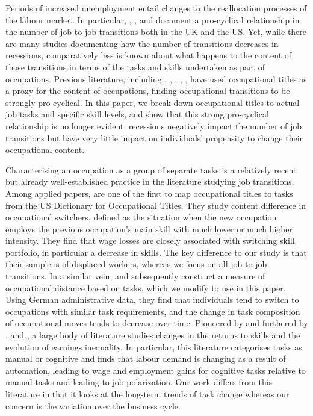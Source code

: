 \documentclass[preprint,12pt,authoryear]{elsarticle}
\begin{document}
Periods of increased unemployment entail changes to the reallocation processes of the labour market. In particular,  \cite{Carrillo-Tudela2016},  \cite{MurphyTopel1987}, \cite{Moscarini2007} and \cite{Kambourov2008} document a pro-cyclical relationship in the number of job-to-job transitions both in the UK and the US. Yet, while there are many studies documenting how the number of transitions decreases in recessions, comparatively less is known about what happens to the content of those transitions in terms of the tasks and skills undertaken as part of occupations. Previous literature, including \cite{MurphyTopel1987}, \cite{Moscarini2007}, \cite{Kambourov2008}, \cite{Carrillo-Tudela2014}, \cite{Carrillo-Tudela2016}, have used occupational titles as a proxy for the content of occupations, finding occupational transitions to be strongly pro-cyclical. 	
In this paper, we break down occupational titles to actual job tasks and specific skill levels, and show that this strong pro-cyclical relationship is no longer evident: recessions negatively impact the number of job transitions but have very little impact on individuals' propensity to change their occupational content. 

\vspace{2mm}

Characterising an occupation as a group of separate tasks is a relatively recent but already well-established practice in the literature studying job transitions. Among applied papers, \cite{Poletaev2008} are one of the first to map occupational titles to tasks from the US Dictionary for Occupational Titles. %
They study content difference in occupational switchers, defined as the situation when the new occupation employs the previous occupation's main skill with much lower or much higher intensity. They find that wage losses are closely associated with switching skill portfolio, in particular a decrease in skills. The key difference to our study is that their sample is of displaced workers, whereas we focus on all job-to-job transitions. %
In a similar vein, \cite{Gathmann2010} and subsequently \cite{robinson2018} construct a measure of occupational distance based on tasks, which we modify to use in this paper. Using German administrative data, they find that individuals tend to switch to occupations with similar task requirements, and the change in task composition of occupational moves tends to decrease over time.  Pioneered by \cite{ALM2003} and furthered by \cite{AcemogluAutor2011}, \cite{AutorDorn2013}  and \cite{GoosManningSalomons2014}, a large body of literature studies changes in the returns to skills and the evolution of earnings inequality. In particular, this literature categorises tasks as manual or cognitive and finds that labour demand is changing as a result of automation, leading to wage and employment gains for cognitive tasks relative to manual tasks and leading to job polarization. Our work differs from this literature in that it looks at the long-term trends of task change whereas our concern is the variation over the business cycle.
\end{document}
